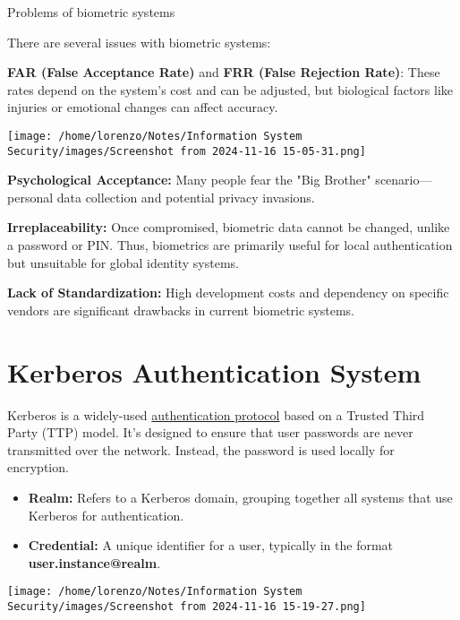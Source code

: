 \begin{quotebox}[colframe=blue!10!white, colback=blue!5!white]{Problems of biometric systems}{
    There are several issues with biometric systems:
    \begin{itemize}
        \begin{minipage}{0.7\textwidth}
        \item \textbf{FAR (False Acceptance Rate)} and \textbf{FRR (False Rejection Rate)}: These rates depend on the system's cost and can be adjusted, but biological factors like injuries or emotional changes can affect accuracy.
        \end{minipage} 
        \hspace{-1.2cm}
        \begin{minipage}{0.4\textwidth}
            \centering
            \texttt{[image: /home/lorenzo/Notes/Information System Security/images/Screenshot from 2024-11-16 15-05-31.png]}
        \end{minipage}
        
        \item \textbf{Psychological Acceptance:} Many people fear the "Big Brother" scenario—personal data collection and potential privacy invasions.
        \item \textbf{Irreplaceability:} Once compromised, biometric data cannot be changed, unlike a password or PIN. Thus, biometrics are primarily useful for local authentication but unsuitable for global identity systems.
        \item \textbf{Lack of Standardization:} High development costs and dependency on specific vendors are significant drawbacks in current biometric systems.
    \end{itemize}}
\end{quotebox}
\newpage
\section{Kerberos Authentication System}
\begin{minipage}{0.8\textwidth}
\vspace{-0.5cm}
Kerberos is a widely-used \underline{authentication protocol} based on a Trusted Third Party (TTP) model. It's designed to ensure that user passwords are never transmitted over the network. Instead, the password is used locally for encryption.
\begin{itemize}
    \item \textbf{Realm:} Refers to a Kerberos domain, grouping together all systems that use Kerberos for authentication.
    \item \textbf{Credential:} A unique identifier for a user, typically in the format \textbf{user.instance@realm}.
    \end{itemize}
\end{minipage} 
\hspace{-1.2cm}
\begin{minipage}{0.3\textwidth}
    \centering
    \texttt{[image: /home/lorenzo/Notes/Information System Security/images/Screenshot from 2024-11-16 15-19-27.png]}
\end{minipage}

